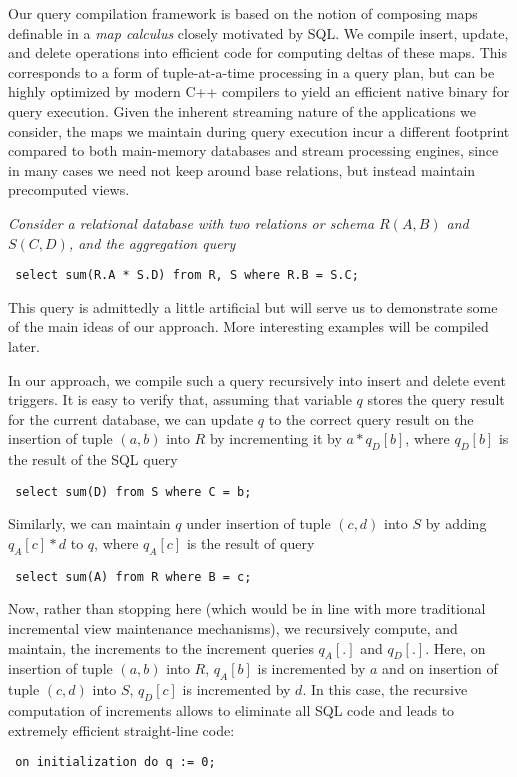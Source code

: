 Our query compilation framework is based on the notion of composing maps
definable in a {\em map calculus}\/ closely motivated by SQL.  We compile insert,
update, and delete operations into efficient code for computing deltas of these
maps. This corresponds to a form of tuple-at-a-time processing in a query plan,
but can be highly optimized by modern C++ compilers to yield an efficient native
binary for query execution.  Given the inherent streaming nature of the
applications we consider, the maps we maintain during query execution incur a
different footprint compared to both main-memory databases and stream processing
engines, since in many cases we need not keep around base relations, but instead
maintain precomputed views.



\begin{example}\em Consider a relational database with two relations or schema
$R(A,B)$ and $S(C,D)$, and the aggregation query
\begin{verbatim} select sum(R.A * S.D) from R, S where R.B = S.C;
\end{verbatim} This query is admittedly a little artificial but will serve us to
demonstrate some of the main ideas of our approach. More interesting examples
will be compiled later.

In our approach, we compile such a query recursively into insert and delete
event triggers.  It is easy to verify that, assuming that variable $q$ stores
the query result for the current database, we can update $q$ to the correct
query result on the insertion of tuple $(a,b)$ into $R$ by incrementing it by $a
* q_D[b]$, where $q_D[b]$ is the result of the SQL query
\begin{verbatim} select sum(D) from S where C = b;
\end{verbatim} Similarly, we can maintain $q$ under insertion of tuple $(c,d)$
into $S$ by adding $q_A[c] * d$ to $q$, where $q_A[c]$ is the result of query
\begin{verbatim} select sum(A) from R where B = c;
\end{verbatim} Now, rather than stopping here (which would be in line with more
traditional incremental view maintenance mechanisms), we recursively compute,
and maintain, the increments to the increment queries $q_A[.]$ and $q_D[.]$.
Here, on insertion of tuple $(a,b)$ into $R$, $q_A[b]$ is incremented by $a$ and
on insertion of tuple $(c,d)$ into $S$, $q_D[c]$ is incremented by $d$.  In this
case, the recursive computation of increments allows to eliminate all SQL code
and leads to extremely efficient straight-line code:
\begin{verbatim} on initialization do q := 0;


\end{verbatim}
\end{example}
